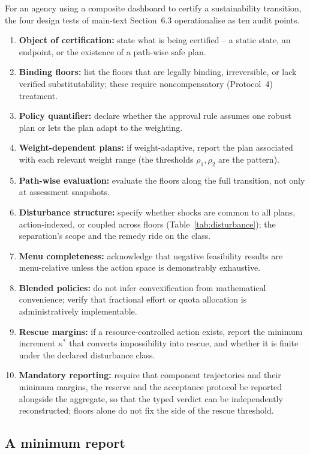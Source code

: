 \documentclass[preprint,11pt,authoryear]{elsarticle}
\theoremstyle{remark}
\begin{document}
For an agency using a composite dashboard to certify a sustainability transition, the four design tests of main-text Section~6.3 operationalise as ten audit points.
\begin{enumerate}[leftmargin=2em]
\item \textbf{Object of certification:} state what is being certified -- a static state, an endpoint, or the existence of a path-wise safe plan.
\item \textbf{Binding floors:} list the floors that are legally binding, irreversible, or lack verified substitutability; these require noncompensatory (Protocol~4) treatment.
\item \textbf{Policy quantifier:} declare whether the approval rule assumes one robust plan or lets the plan adapt to the weighting.
\item \textbf{Weight-dependent plans:} if weight-adaptive, report the plan associated with each relevant weight range (the thresholds $\rho_1,\rho_2$ are the pattern).
\item \textbf{Path-wise evaluation:} evaluate the floors along the full transition, not only at assessment snapshots.
\item \textbf{Disturbance structure:} specify whether shocks are common to all plans, action-indexed, or coupled across floors (Table~\ref{tab:disturbance}); the separation's scope and the remedy ride on the class.
\item \textbf{Menu completeness:} acknowledge that negative feasibility results are menu-relative unless the action space is demonstrably exhaustive.
\item \textbf{Blended policies:} do not infer convexification from mathematical convenience; verify that fractional effort or quota allocation is administratively implementable.
\item \textbf{Rescue margins:} if a resource-controlled action exists, report the minimum increment $\kappa^*$ that converts impossibility into rescue, and whether it is finite under the declared disturbance class.
\item \textbf{Mandatory reporting:} require that component trajectories and their minimum margins, the reserve and the acceptance protocol be reported alongside the aggregate, so that the typed verdict can be independently reconstructed; floors alone do not fix the side of the rescue threshold.
\end{enumerate}

\subsection{A minimum report}
\end{document}
